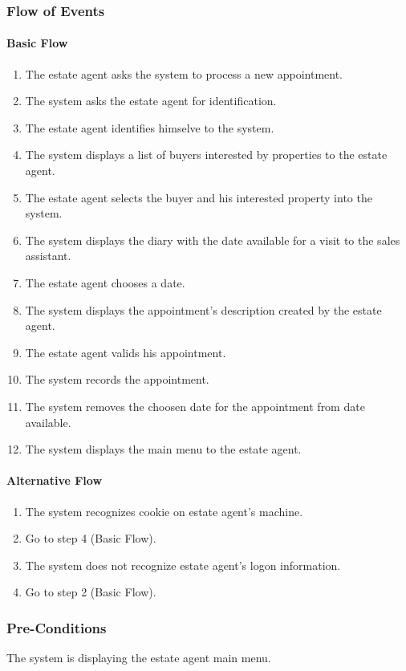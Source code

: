 \documentclass[a4paper,12pt]{article}
\begin{document}
\subsubsection{Flow of Events}
\paragraph{Basic Flow}
\begin{enumerate}
\item The estate agent asks the system to process a new appointment.
\item The system asks the estate agent for identification.
\item The estate agent identifies himselve to the system.
\item The system displays a list of buyers interested by properties to the estate agent.
\item The estate agent selects the buyer and his interested property into the system.
\item The system displays the diary with the date available for a visit to the sales assistant.
\item The estate agent chooses a date.
\item The system displays the appointment's description created by the estate agent.
\item The estate agent valids his appointment.
\item The system records the appointment.
\item The system removes the choosen date for the appointment from date available.
\item The system displays the main menu to the estate agent.
\end{enumerate}
\paragraph{Alternative Flow}
\begin{enumerate}
\item The system recognizes cookie on estate agent's machine. 
\item Go to step 4 (Basic Flow).
\item The system does not recognize estate agent's logon information.
\item Go to step 2 (Basic Flow).
\end{enumerate}
\subsubsection{Pre-Conditions}
The system is displaying the estate agent main menu.
\end{document}
